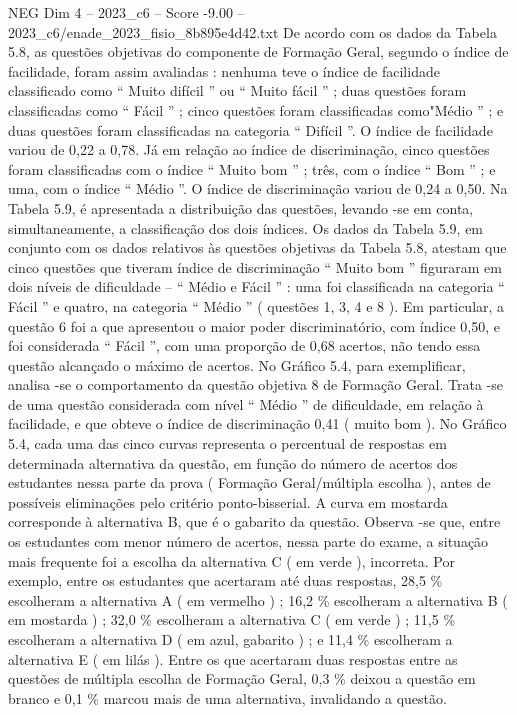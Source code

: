 \begin{textsample}{NEG Dim 4 – 2023\_c6 – Score -9.00 – 2023\_c6/enade\_2023\_fisio\_8b895e4d42.txt}
De acordo com os dados da Tabela 5.8, as questões objetivas do componente de Formação Geral, segundo o índice de facilidade, foram assim avaliadas : nenhuma teve o índice de facilidade classificado como “ Muito difícil ” ou “ Muito fácil ” ; duas questões foram classificadas como “ Fácil ” ; cinco questões foram classificadas como"Médio ” ; e duas questões foram classificadas na categoria “ Difícil ”.
O índice de facilidade variou de 0,22 a 0,78.
Já em relação ao índice de discriminação, cinco questões foram classificadas com o índice “ Muito bom ” ; três, com o índice “ Bom ” ; e uma, com o índice “ Médio ”.
O índice de discriminação variou de 0,24 a 0,50.
Na Tabela 5.9, é apresentada a distribuição das questões, levando -se em conta, simultaneamente, a classificação dos dois índices.
Os dados da Tabela 5.9, em conjunto com os dados relativos às questões objetivas da Tabela 5.8, atestam que cinco questões que tiveram índice de discriminação “ Muito bom ” figuraram em dois níveis de dificuldade – “ Médio e Fácil ” : uma foi classificada na categoria “ Fácil ” e quatro, na categoria “ Médio ” ( questões 1, 3, 4 e 8 ).
Em particular, a questão 6 foi a que apresentou o maior poder discriminatório, com índice 0,50, e foi considerada “ Fácil ”, com uma proporção de 0,68 acertos, não tendo essa questão alcançado o máximo de acertos.
No Gráfico 5.4, para exemplificar, analisa -se o comportamento da questão objetiva 8 de Formação Geral.
Trata -se de uma questão considerada com nível “ Médio ” de dificuldade, em relação à facilidade, e que obteve o índice de discriminação 0,41 ( muito bom ).
No Gráfico 5.4, cada uma das cinco curvas representa o percentual de respostas em determinada alternativa da questão, em função do número de acertos dos estudantes nessa parte da prova ( Formação Geral/múltipla escolha ), antes de possíveis eliminações pelo critério ponto-bisserial.
A curva em mostarda corresponde à alternativa B, que é o gabarito da questão.
Observa -se que, entre os estudantes com menor número de acertos, nessa parte do exame, a situação mais frequente foi a escolha da alternativa C ( em verde ), incorreta.
Por exemplo, entre os estudantes que acertaram até duas respostas, 28,5 \% escolheram a alternativa A ( em vermelho ) ; 16,2 \% escolheram a alternativa B ( em mostarda ) ; 32,0 \% escolheram a alternativa C ( em verde ) ; 11,5 \% escolheram a alternativa D ( em azul, gabarito ) ; e 11,4 \% escolheram a alternativa E ( em lilás ).
Entre os que acertaram duas respostas entre as questões de múltipla escolha de Formação Geral, 0,3 \% deixou a questão em branco e 0,1 \% marcou mais de uma alternativa, invalidando a questão.

\end{textsample}
